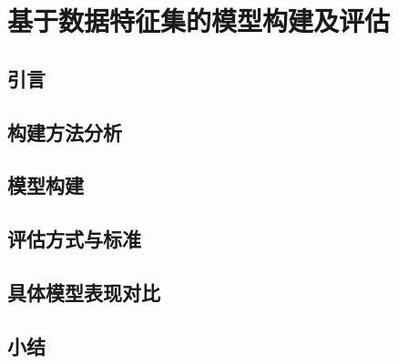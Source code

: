 \chapter{基于数据特征集的模型构建及评估}
\section{引言}

\section{构建方法分析}
\section{模型构建}
\section{评估方式与标准}
\section{具体模型表现对比}
\section{小结}